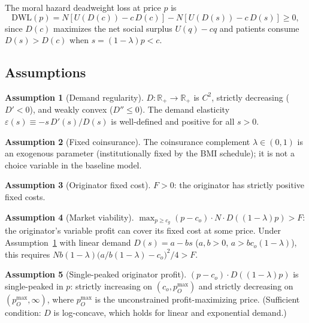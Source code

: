 \documentclass[12pt]{article}
\theoremstyle{plain}
\theoremstyle{definition}
\newtheorem{assumption}{Assumption}
\theoremstyle{remark}
\newcommand{\1}{\mathbf{1}}
\begin{document}
The moral hazard deadweight loss at price $p$ is
\begin{equation}
\mathrm{DWL}(p) = N\!\left[U(D(c)) - c\,D(c)\right] - N\!\left[U(D(s)) - c\,D(s)\right] \geq 0,
\label{eq:dwl}
\end{equation}
since $D(c)$ maximizes the net social surplus $U(q) - cq$ and patients consume $D(s) > D(c)$ when $s = (1-\lambda)p < c$.

\subsection{Assumptions}

\begin{assumption}[Demand regularity]
\label{ass:demand}
$D:\mathbb{R}_+ \to \mathbb{R}_+$ is $C^2$, strictly decreasing ($D' < 0$), and weakly convex ($D'' \leq 0$). The demand elasticity $\varepsilon(s) \equiv -s\,D'(s)/D(s)$ is well-defined and positive for all $s > 0$.
\end{assumption}

\begin{assumption}[Fixed coinsurance]
\label{ass:lambda}
The coinsurance complement $\lambda \in (0,1)$ is an exogenous parameter (institutionally fixed by the BMI schedule); it is not a choice variable in the baseline model.
\end{assumption}

\begin{assumption}[Originator fixed cost]
\label{ass:fixedcost}
$F > 0$: the originator has strictly positive fixed costs.
\end{assumption}

\begin{assumption}[Market viability]
\label{ass:viable}
$\max_{p \geq c_g}(p - c_o)\cdot N \cdot D\!\left((1-\lambda)p\right) > F$: the originator's variable profit can cover its fixed cost at some price. Under Assumption~\ref{ass:demand} with linear demand $D(s) = a - bs$ ($a, b > 0$, $a > bc_o(1-\lambda)$), this requires $Nb(1-\lambda)\bigl(a/b(1-\lambda) - c_o\bigr)^2/4 > F$.
\end{assumption}

\begin{assumption}[Single-peaked originator profit]
\label{ass:singlepeaked}
$(p - c_o)\cdot D\!\left((1-\lambda)p\right)$ is single-peaked in $p$: strictly increasing on $(c_o, p_O^{\max})$ and strictly decreasing on $(p_O^{\max}, \infty)$, where $p_O^{\max}$ is the unconstrained profit-maximizing price. (Sufficient condition: $D$ is log-concave, which holds for linear and exponential demand.)
\end{assumption}
\end{document}
